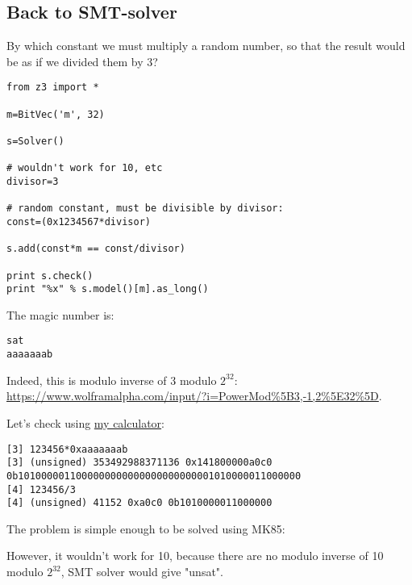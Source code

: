 \subsection{Back to SMT-solver}

By which constant we must multiply a random number, so that the result would be as if we divided them by 3?

\begin{lstlisting}
from z3 import *

m=BitVec('m', 32)

s=Solver()

# wouldn't work for 10, etc
divisor=3

# random constant, must be divisible by divisor:
const=(0x1234567*divisor)

s.add(const*m == const/divisor)

print s.check()
print "%x" % s.model()[m].as_long()
\end{lstlisting}

The magic number is:

\begin{lstlisting}
sat
aaaaaaab
\end{lstlisting}

Indeed, this is modulo inverse of 3 modulo $2^{32}$: \url{https://www.wolframalpha.com/input/?i=PowerMod%5B3,-1,2%5E32%5D}.

Let's check using \href{https://github.com/DennisYurichev/progcalc}{my calculator}:

\begin{lstlisting}
[3] 123456*0xaaaaaaab
[3] (unsigned) 353492988371136 0x141800000a0c0 0b1010000011000000000000000000000001010000011000000
[4] 123456/3
[4] (unsigned) 41152 0xa0c0 0b1010000011000000
\end{lstlisting}

The problem is simple enough to be solved using MK85:





However, it wouldn't work for 10, because there are no modulo inverse of 10 modulo $2^{32}$, SMT solver would give "unsat".

